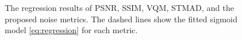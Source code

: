 \documentclass{sig-alternate}
\begin{document}
\begin{figure}
{}
\hspace*{1.7in}
\caption{\label{fig:fitting} The regression results of PSNR, SSIM, VQM, STMAD, and the proposed noise metrics. The dashed lines show the fitted sigmoid model \eqref{eq:regression} for each metric.}
\end{figure}
\end{document}

